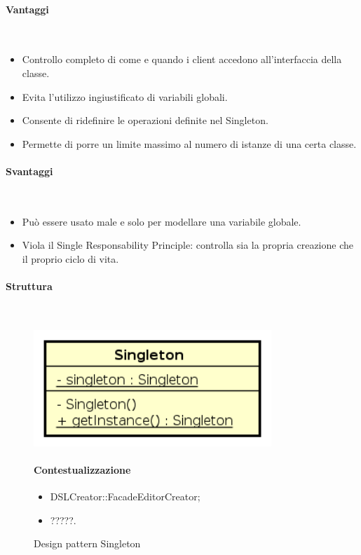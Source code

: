 \paragraph{Vantaggi} \mbox{} \\
\begin{itemize}
\item Controllo completo di come e quando i client accedono all’interfaccia della classe.
\item Evita l’utilizzo ingiustificato di variabili globali.
\item Consente di ridefinire le operazioni definite nel Singleton.
\item Permette di porre un limite massimo al numero di istanze di una certa classe.
\end{itemize}
\paragraph{Svantaggi} \mbox{} \\
\begin{itemize}
\item Può essere usato male e solo per modellare una variabile globale.
\item Viola il Single Responsability Principle: controlla sia la propria creazione che il proprio ciclo di vita.
\end{itemize}
\paragraph{Struttura} \mbox{} \\
\begin{figure}[H]
\centering
\includegraphics[width=0.8\textwidth]{res/sections/backend/singleton.png}
\caption{Design pattern Singleton}
\paragraph{Contestualizzazione}
\begin{itemize}
\item DSLCreator::FacadeEditorCreator;
\item ?????.
\end{itemize}
\end{figure}
